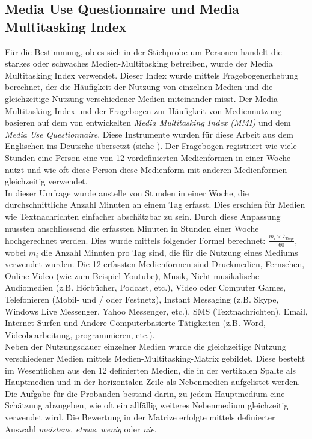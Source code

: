 \subsection{Media Use Questionnaire und Media Multitasking Index}\label{subsection.muq}
Für die Bestimmung, ob es sich in der Stichprobe um Personen handelt die starkes oder schwaches Medien-Multitasking betreiben, wurde der Media Multitasking Index verwendet. Dieser Index wurde mittels Fragebogenerhebung berechnet, der die Häufigkeit der Nutzung von einzelnen Medien und die gleichzeitige Nutzung verschiedener Medien miteinander misst. Der Media Multitasking Index und der Fragebogen zur Häufigkeit von Mediennutzung basieren auf dem von  entwickelten \textit{Media Multitasking Index (MMI)} und dem \textit{Media Use Questionnaire}. Diese Instrumente wurden für diese Arbeit aus dem Englischen ins Deutsche übersetzt (siehe ). Der Fragebogen registriert wie viele Stunden eine Person eine von 12 vordefinierten Medienformen in einer Woche nutzt und wie oft diese Person diese Medienform mit anderen Medienformen gleichzeitig verwendet. \\ 
In dieser Umfrage wurde anstelle von Stunden in einer Woche, die durchschnittliche Anzahl Minuten an einem Tag erfasst. Dies erschien für Medien wie Textnachrichten einfacher abschätzbar zu sein. Durch diese Anpassung mussten anschliessend die erfassten Minuten in Stunden einer Woche hochgerechnet werden. Dies wurde mittels folgender Formel berechnet: \(\frac{m_{i} \times 7_{Tage}}{60}\), wobei \(m_{i}\) die Anzahl Minuten pro Tag sind, die für die Nutzung eines Mediums verwendet wurden. Die 12 erfassten Medienformen sind Druckmedien, Fernsehen, Online Video (wie zum Beispiel Youtube), Musik, Nicht-musikalische Audiomedien (z.B. Hörbücher, Podcast, etc.), Video oder Computer Games, Telefonieren (Mobil- und / oder Festnetz), Instant Messaging (z.B. Skype, Windows Live Messenger, Yahoo Messenger, etc.), SMS (Textnachrichten), Email, Internet-Surfen und Andere Computerbasierte-Tätigkeiten (z.B. Word, Videobearbeitung, programmieren, etc.). \\
Neben der Nutzungsdauer einzelner Medien wurde die gleichzeitige Nutzung verschiedener Medien mittels Medien-Multitasking-Matrix gebildet. Diese besteht im Wesentlichen aus den 12 definierten Medien, die in der vertikalen Spalte als Hauptmedien und in der horizontalen Zeile als Nebenmedien aufgelistet werden. Die Aufgabe für die Probanden bestand darin, zu jedem Hauptmedium eine Schätzung abzugeben, wie oft ein allfällig weiteres Nebenmedium gleichzeitig verwendet wird. Die Bewertung in der Matrize erfolgte mittels definierter Auswahl \textit{meistens}, \textit{etwas}, \textit{wenig} oder \textit{nie}.\\
